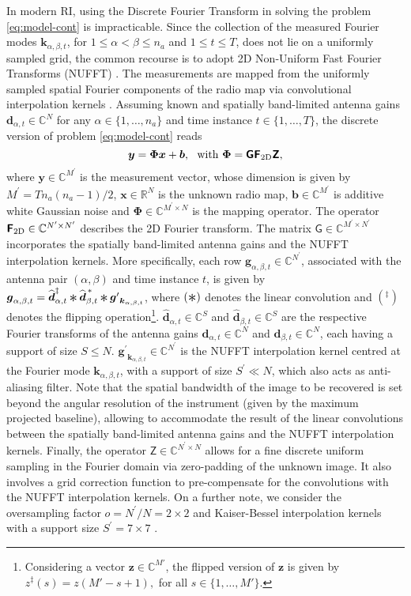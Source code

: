 \documentclass[fleqn,usenatbib]{mnras}
\newcommand{\Conv}{\mathop{\scalebox{1.5}{\raisebox{-0.2ex}{$\ast$}}}}%
\newcommand{\bb}{\ensuremath{\boldsymbol{b}}}
\newcommand{\db}{\ensuremath{\boldsymbol{d}}}
\newcommand{\kb}{\ensuremath{\boldsymbol{k}}}
\newcommand{\xb}{\ensuremath{\boldsymbol{x}}}
\newcommand{\yb}{\ensuremath{\boldsymbol{y}}}
\newcommand{\zb}{\ensuremath{\boldsymbol{z}}}
\newcommand{\gb}{\ensuremath{\boldsymbol{g}}}
\newcommand{\Fb}{\ensuremath{\boldsymbol{\mathsf{F}}}}
\newcommand{\Gb}{\ensuremath{\boldsymbol{\mathsf{G}}}}
\newcommand{\Zb}{\ensuremath{\boldsymbol{\mathsf{Z}}}}
\newcommand{\Phib}{\ensuremath{\boldsymbol{\Phi}}}
\newcommand{\eC}{\mathbb{C}}
\newcommand{\eR}{\mathbb{R}}
\newcommand{\oN}{{N^\prime}}
\begin{document}
In modern RI, using the Discrete Fourier Transform in solving the problem \eqref{eq:model-cont} is impracticable. Since the collection of the measured Fourier modes $ \kb_{\alpha,\beta,t}$, 
 for $ 1 \le \alpha < \beta \le n_a$ and ${1\le t \le T}$, does not lie on a uniformly sampled grid, the common recourse is to adopt 2D Non-Uniform Fast Fourier Transforms (NUFFT) \citep[see][]{memo,Thompson2007}. The measurements are mapped from the uniformly sampled spatial Fourier components of the radio map via convolutional interpolation kernels {\citep[e.g.][]{Fessler2003}}. Assuming known and spatially band-limited antenna gains ${\db}_{\alpha,t} \in \eC^{N}$ for any $\alpha \in \{1,\dots,n_a\}$ and time instance $t\in \{1,\dots,T\}$, the discrete version of problem \eqref{eq:model-cont} reads \citep{onose2016}
\begin{equation} 
 \label{eq:model-dist}
 \yb =\Phib{\xb} +\bb, \text{~ with } \Phib = \Gb{\Fb_{\rm2D} {\Zb}},
\end{equation}
where $\yb \in \eC^{M^{\prime}}$ is the measurement vector, whose dimension is given by ${M^{\prime}}=T n_a (n_a-1)/2$, $\xb\in\eR^N$ is the unknown radio map, $\bb\in \eC^{M^{\prime}}$ is additive white Gaussian noise and $\Phib\in \eC^{M^{\prime} \times N}$ is the mapping operator. The operator ${\Fb}_{\rm 2D}\in\eC^{\oN\times \oN}$ describes the 2D Fourier transform. The matrix ${\Gb} \in \eC^{{M^{\prime}}\times\oN}$ incorporates the spatially band-limited antenna gains and the NUFFT interpolation kernels. More specifically, each row $\gb_{\alpha,\beta,t} \in \eC^{\oN}$, associated with the antenna pair $(\alpha, \beta)$ and time instance $t$, is given by $ \gb_{\alpha,\beta,t}=\widehat{\db}^{\ddagger}_{\alpha,t} \Conv \widehat{\db}_{\beta,t}^{\,\ast} \Conv {\gb^\prime}_{\kb_{\alpha,\beta,t}}$, where $(\Conv) $ denotes the linear convolution and $(^\ddagger) $ denotes the flipping operation\footnote{Considering a vector $\zb \in \eC^{M'}$, the flipped version of $\zb$ is given by $z^{\ddagger}(s)=z(M'-s+1), $ for all $s\in\{1,\dots,M'\}$.}.
$\widehat{\db}_{\alpha,t} \in \eC^{S}$ and $\widehat{\db}_{\beta,t} \in \eC^{S}$ are the respective Fourier transforms of the antenna gains ${\db}_{\alpha,t} \in \eC^{N}$ and ${\db}_{\beta,t} \in \eC^{N}$, each having a support of size $S\le N$. ${\gb^\prime}_{\kb_{{\alpha,\beta,t}}} \in \eC^{\oN}$ is the NUFFT interpolation kernel centred at the Fourier mode $\kb_{\alpha,\beta,t}$, with a support of size ${S^\prime}\ll N$, which also acts as anti-aliasing filter. Note that the spatial bandwidth of the image to be recovered is set beyond the angular resolution of the instrument (given by the maximum projected baseline), allowing to accommodate the result of the linear convolutions between the spatially band-limited antenna gains and the NUFFT interpolation kernels. Finally, the operator $\Zb \in \eC^{\oN\times N}$ allows for a fine discrete uniform sampling in the Fourier domain via zero-padding of the unknown image. It also involves a grid correction function to pre-compensate for the convolutions with the NUFFT interpolation kernels. On a further note, we consider the oversampling factor ${o}=\oN{/N}=2\times 2$ and Kaiser-Bessel interpolation kernels with a support size ${S^\prime}=7\times 7$ \citep{Fessler2003}.
\end{document}
